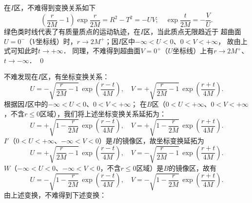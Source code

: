 在$I$区，不难得到变换关系如下
\begin{equation}
    \left(\frac{r}{2M}-1\right) \exp{\frac{r}{2M}} = R^2-T^2= -U V;
    \quad \exp\frac{t}{2M}= -\frac{V}{U} .
\end{equation}
绿色类时线代表了有质量质点的运动轨迹，在$I$区，当此质点无限趋近于
超曲面$U=0^{-}$（$V$坐标线）时，$r\to 2M^{+}$；因$I$区中$-\infty< U <0$、$0<V<+\infty $，
故由上式可知此时$t\to +\infty$．
同理，不难得到超曲面$V=0^{+}$（$U$坐标线）上有$r\to 2M^{+}$、$t\to -\infty$．
\qed

不难发现在$I$区，有坐标变换关系：
\begin{equation}
    U= -\sqrt{\frac{r}{2M}-1}\, \exp\left(\frac{r-t}{4M}\right), \quad
    V= +\sqrt{\frac{r}{2M}-1}\, \exp\left(\frac{r+t}{4M}\right).
\end{equation}
根据因$I$区中的$-\infty< U <0$、$0<V<+\infty $；
在$B$区（$0< U <+\infty$、$0<V<+\infty $，不含$r\leqslant 0$区域），我们将上述坐标变换关系延拓为：
\begin{equation}
    U= +\sqrt{1-\frac{r}{2M}}\, \exp\left(\frac{r-t}{4M}\right), \quad
    V= +\sqrt{1-\frac{r}{2M}}\, \exp\left(\frac{r+t}{4M}\right).
\end{equation}
$I'$（$0< U <+\infty$、$-\infty< V <0$）是$I$的镜像区，故坐标变换延拓为
\begin{equation}
    U= +\sqrt{\frac{r}{2M}-1}\, \exp\left(\frac{r-t}{4M}\right), \quad
    V= -\sqrt{\frac{r}{2M}-1}\, \exp\left(\frac{r+t}{4M}\right).
\end{equation}
$W$（$-\infty< U <0$、$-\infty< V <0$，不含$r\leqslant 0$区域）是$B$的镜像区，故有
\begin{equation}
    U= -\sqrt{1-\frac{r}{2M}}\, \exp\left(\frac{r-t}{4M}\right), \quad
    V= -\sqrt{1-\frac{r}{2M}}\, \exp\left(\frac{r+t}{4M}\right).
\end{equation}
由上述变换，不难得到下述变换：
